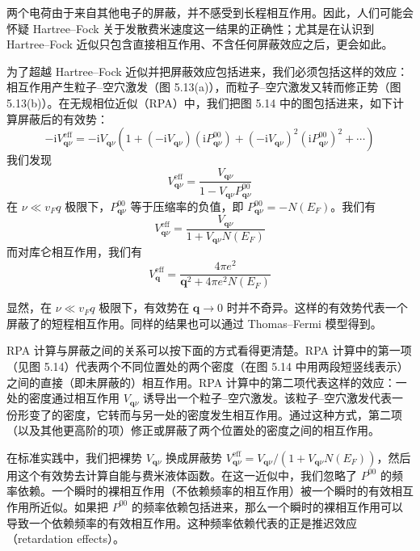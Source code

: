 两个电荷由于来自其他电子的屏蔽，并不感受到长程相互作用。因此，人们可能会怀疑 Hartree–Fock 关于发散费米速度这一结果的正确性；尤其是在认识到 Hartree–Fock 近似只包含直接相互作用、不含任何屏蔽效应之后，更会如此。



为了超越 Hartree–Fock 近似并把屏蔽效应包括进来，我们必须包括这样的效应：相互作用产生粒子–空穴激发（图 5.13(a)），而粒子–空穴激发又转而修正势（图 5.13(b)）。在无规相位近似（RPA）中，我们把图 5.14 中的图包括进来，如下计算屏蔽后的有效势：
\begin{equation*}
-\mathrm{i}V_{\pmb{q}\nu}^{\mathrm{eff}}=-\mathrm{i}V_{\pmb{q}\nu}\left(1+(-\mathrm{i}V_{\pmb{q}\nu})(\mathrm{i}P^{00}_{\pmb{q}\nu})+(-\mathrm{i}V_{\pmb{q}\nu})^{2}(\mathrm{i}P^{00}_{\pmb{q}\nu})^{2}+\cdots\right)
\end{equation*}
我们发现
\begin{equation*}
V_{\pmb{q}\nu}^{\mathrm{eff}}=\frac{V_{\pmb{q}\nu}}{1-V_{\pmb{q}\nu}P^{00}_{\pmb{q}\nu}}
\end{equation*}
在 $\nu\ll v_{F}q$ 极限下，$P^{00}_{\pmb{q}\nu}$ 等于压缩率的负值，即 $P^{00}_{\pmb{q}\nu}=-N(E_{F})$。我们有
\begin{equation*}
V_{\pmb{q}\nu}^{\mathrm{eff}}=\frac{V_{\pmb{q}\nu}}{1+V_{\pmb{q}\nu}N(E_{F})}
\end{equation*}
而对库仑相互作用，我们有
\begin{equation*}
V^{\mathrm{eff}}_{\pmb{q}}=\frac{4\pi e^{2}}{\pmb{q}^{2}+4\pi e^{2}N(E_{F})}
\end{equation*}


显然，在 $\nu\ll v_{F}q$ 极限下，有效势在 $\pmb{q}\to 0$ 时并不奇异。这样的有效势代表一个屏蔽了的短程相互作用。同样的结果也可以通过 Thomas–Fermi 模型得到。

RPA 计算与屏蔽之间的关系可以按下面的方式看得更清楚。RPA 计算中的第一项（见图 5.14）代表两个不同位置处的两个密度（在图 5.14 中用两段短竖线表示）之间的直接（即未屏蔽的）相互作用。RPA 计算中的第二项代表这样的效应：一处的密度通过相互作用 $V_{\pmb{q}\nu}$ 诱导出一个粒子–空穴激发。该粒子–空穴激发代表一份形变了的密度，它转而与另一处的密度发生相互作用。通过这种方式，第二项（以及其他更高阶的项）修正或屏蔽了两个位置处的密度之间的相互作用。

在标准实践中，我们把裸势 $V_{\pmb{q}\nu}$ 换成屏蔽势 $V^{\mathrm{eff}}_{\pmb{q}\nu}=V_{\pmb{q}\nu}/(1+V_{\pmb{q}\nu}N(E_{F}))$，然后用这个有效势去计算自能与费米液体函数。在这一近似中，我们忽略了 $P^{00}$ 的频率依赖。一个瞬时的裸相互作用（不依赖频率的相互作用）被一个瞬时的有效相互作用所近似。如果把 $P^{00}$ 的频率依赖包括进来，那么一个瞬时的裸相互作用可以导致一个依赖频率的有效相互作用。这种频率依赖代表的正是推迟效应（retardation effects）。

